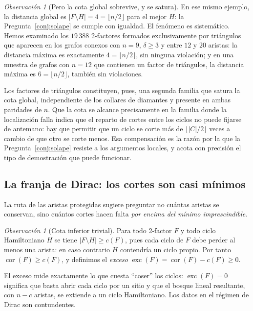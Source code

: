 \documentclass[11pt,a4paper]{article}
\theoremstyle{definition}
\theoremstyle{remark}
\newtheorem{observacion}[teorema]{Observación}
\begin{document}
\begin{observacion}[Pero la cota global sobrevive, y se satura]\label{obs:triangulos}
En ese mismo ejemplo, la distancia global es $|F\setminus H|=4=\lfloor n/2\rfloor$ para el mejor $H$: la Pregunta~\ref{conj:solape} se cumple con igualdad. El fenómeno es sistemático. Hemos examinado los $19\,388$ 2-factores formados exclusivamente por triángulos que aparecen en los grafos conexos con $n=9$, $\delta\ge3$ y entre $12$ y $20$ aristas: la distancia máxima es exactamente $4=\lfloor n/2\rfloor$, sin ninguna violación; y en una muestra de grafos con $n=12$ que contienen un factor de triángulos, la distancia máxima es $6=\lfloor n/2\rfloor$, también sin violaciones.

Los factores de triángulos constituyen, pues, una segunda familia que satura la cota global, independiente de los collares de diamantes y presente en ambas paridades de $n$. Que la cota se alcance precisamente en la familia donde la localización falla indica que el reparto de cortes entre los ciclos no puede fijarse de antemano: hay que permitir que un ciclo se corte más de $\lfloor|C|/2\rfloor$ veces a cambio de que otro se corte menos. Esa compensación es la razón por la que la Pregunta~\ref{conj:solape} resiste a los argumentos locales, y acota con precisión el tipo de demostración que puede funcionar.
\end{observacion}



\subsection{La franja de Dirac: los cortes son casi mínimos}\label{sub:excesodirac}

La ruta de las aristas protegidas sugiere preguntar no cuántas aristas se conservan, sino cuántos cortes hacen falta \emph{por encima del mínimo imprescindible}.

\begin{observacion}[Cota inferior trivial]\label{obs:corinf}
Para todo 2-factor $F$ y todo ciclo Hamiltoniano $H$ se tiene $|F\setminus H|\ge c(F)$, pues cada ciclo de $F$ debe perder al menos una arista: en caso contrario $H$ contendría un ciclo propio. Por tanto $\operatorname{cor}(F)\ge c(F)$, y definimos el \emph{exceso} $\operatorname{exc}(F)=\operatorname{cor}(F)-c(F)\ge0$.
\end{observacion}

El exceso mide exactamente lo que cuesta ``coser'' los ciclos: $\operatorname{exc}(F)=0$ significa que basta abrir cada ciclo por un sitio y que el bosque lineal resultante, con $n-c$ aristas, se extiende a un ciclo Hamiltoniano. Los datos en el régimen de Dirac son contundentes.
\end{document}
